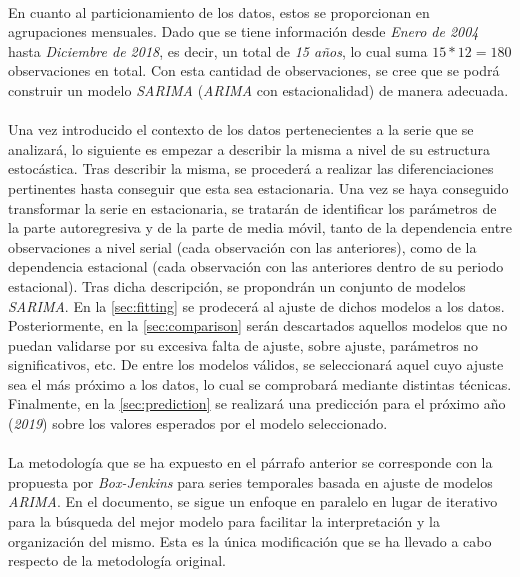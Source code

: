 \documentclass[a4paper, spanish]{article}
\begin{document}
      \paragraph{}
      En cuanto al particionamiento de los datos, estos se proporcionan en agrupaciones mensuales. Dado que se tiene información desde \emph{Enero de 2004} hasta \emph{Diciembre de 2018}, es decir, un total de \emph{15 años}, lo cual suma $15 * 12 = 180$ observaciones en total. Con esta cantidad de observaciones, se cree que se podrá construir un modelo \emph{SARIMA} (\emph{ARIMA} con estacionalidad) de manera adecuada.

      \paragraph{}
      Una vez introducido el contexto de los datos pertenecientes a la serie que se analizará, lo siguiente es empezar a describir la misma a nivel de su estructura estocástica. Tras describir la misma, se procederá a realizar las diferenciaciones pertinentes hasta conseguir que esta sea estacionaria. Una vez se haya conseguido transformar la serie en estacionaria, se tratarán de identificar los parámetros de la parte autoregresiva y de la parte de media móvil, tanto de la dependencia entre observaciones a nivel serial (cada observación con las anteriores), como de la dependencia estacional (cada observación con las anteriores dentro de su periodo estacional). Tras dicha descripción, se propondrán un conjunto de modelos \emph{SARIMA}. En la \autoref{sec:fitting} se prodecerá al ajuste de dichos modelos a los datos. Posteriormente, en la \autoref{sec:comparison} serán descartados aquellos modelos que no puedan validarse por su excesiva falta de ajuste, sobre ajuste, parámetros no significativos, etc. De entre los modelos válidos, se seleccionará aquel cuyo ajuste sea el más próximo a los datos, lo cual se comprobará mediante distintas técnicas. Finalmente, en la \autoref{sec:prediction} se realizará una predicción para el próximo año (\emph{2019}) sobre los valores esperados por el modelo seleccionado.

      \paragraph{}
      La metodología que se ha expuesto en el párrafo anterior se corresponde con la propuesta por \emph{Box-Jenkins} para series temporales basada en ajuste de modelos \emph{ARIMA}. En el documento, se sigue un enfoque en paralelo en lugar de iterativo para la búsqueda del mejor modelo para facilitar la interpretación y la organización del mismo. Esta es la única modificación que se ha llevado a cabo respecto de la metodología original.
\end{document}
